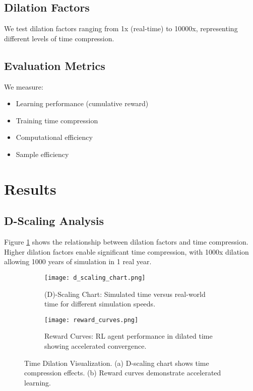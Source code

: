\documentclass[11pt,twocolumn]{article}
\begin{document}
\subsection{Dilation Factors}

We test dilation factors ranging from 1x (real-time) to 10000x, representing different levels of time compression.

\subsection{Evaluation Metrics}

We measure:
\begin{itemize}
    \item Learning performance (cumulative reward)
    \item Training time compression
    \item Computational efficiency
    \item Sample efficiency
\end{itemize}

\section{Results}

\subsection{D-Scaling Analysis}

Figure \ref{fig:d_scaling} shows the relationship between dilation factors and time compression. Higher dilation factors enable significant time compression, with 1000x dilation allowing 1000 years of simulation in 1 real year.

\begin{figure}[h]
\centering
\begin{subfigure}{0.45\textwidth}
    \texttt{[image: d\_scaling\_chart.png]}
    \caption{(D)-Scaling Chart: Simulated time versus real-world time for different simulation speeds.}
    \label{fig:d_scaling}
\end{subfigure}
\hfill
\begin{subfigure}{0.45\textwidth}
    \texttt{[image: reward\_curves.png]}
    \caption{Reward Curves: RL agent performance in dilated time showing accelerated convergence.}
    \label{fig:reward_curves}
\end{subfigure}
\caption{Time Dilation Visualization. (a) D-scaling chart shows time compression effects. (b) Reward curves demonstrate accelerated learning.}
\label{fig:time_dilation}
\end{figure}
\end{document}

